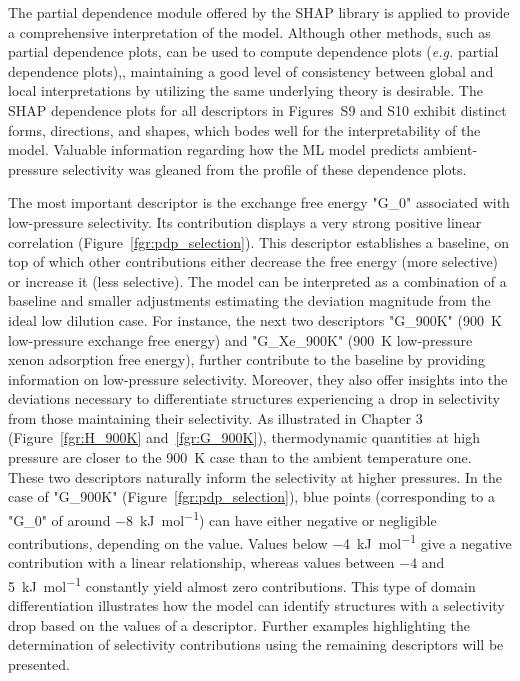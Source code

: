 \documentclass[main]{subfiles}
\begin{document}
The partial dependence module offered by the SHAP library is applied to provide a comprehensive interpretation of the model. Although other methods, such as partial dependence plots, can be used to compute dependence plots (\emph{e.g.} partial dependence plots),\autocite{molnar2020interpretable}, maintaining a good level of consistency between global and local interpretations by utilizing the same underlying theory is desirable. The SHAP dependence plots for all descriptors in Figures~S9 and S10 exhibit distinct forms, directions, and shapes, which bodes well for the interpretability of the model. Valuable information regarding how the ML model predicts ambient-pressure selectivity was gleaned from the profile of these dependence plots.

The most important descriptor is the exchange free energy "G\_0" associated with low-pressure selectivity. Its contribution displays a very strong positive linear correlation (Figure~\ref{fgr:pdp_selection}). This descriptor establishes a baseline, on top of which other contributions either decrease the free energy (more selective) or increase it (less selective). The model can be interpreted as a combination of a baseline and smaller adjustments estimating the deviation magnitude from the ideal low dilution case. For instance, the next two descriptors "G\_900K" (\SI{900}{\kelvin} low-pressure exchange free energy) and "G\_Xe\_900K" (\SI{900}{\kelvin} low-pressure xenon adsorption free energy), further contribute to the baseline by providing information on low-pressure selectivity. Moreover, they also offer insights into the deviations necessary to differentiate structures experiencing a drop in selectivity from those maintaining their selectivity. As illustrated in Chapter 3 (Figure~\ref{fgr:H_900K} and~\ref{fgr:G_900K}), thermodynamic quantities at high pressure are closer to the \SI{900}{\kelvin} case than to the ambient temperature one. These two descriptors naturally inform the selectivity at higher pressures. In the case of "G\_900K" (Figure~\ref{fgr:pdp_selection}), blue points (corresponding to a "G\_0" of around \SI{-8}{\kilo\joule\per\mole}) can have either negative or negligible contributions, depending on the value. Values below \SI{-4}{\kilo\joule\per\mole} give a negative contribution with a linear relationship, whereas values between $-4$ and \SI{5}{\kilo\joule\per\mole} constantly yield almost zero contributions. This type of domain differentiation illustrates how the model can identify structures with a selectivity drop based on the values of a descriptor. Further examples highlighting the determination of selectivity contributions using the remaining descriptors will be presented.
\end{document}
